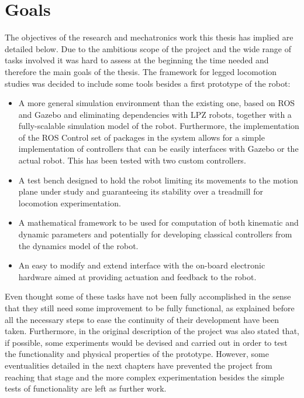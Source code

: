 \section{Goals}
\label{sec:goals}
The objectives of the research and mechatronics work this thesis has implied are detailed below.
Due to the ambitious scope of the project and the wide range of tasks involved it was hard to assess at the beginning the time needed and therefore the main goals of the thesis. 
The framework for legged locomotion studies was decided to include some tools besides a first prototype of the robot:

\begin{itemize}
\item A more general simulation environment than the existing one, based on ROS and Gazebo and eliminating dependencies with LPZ robots, together with a fully-scalable simulation model of the robot. Furthermore, the implementation of the ROS Control set of packages \cite{ros_control} in the system allows for a simple implementation of controllers that can be easily interfaces with Gazebo or the actual robot. This has been tested with two custom controllers.
\item A test bench designed to hold the robot limiting its movements to the motion plane under study and guaranteeing its stability over a treadmill for locomotion experimentation. 
\item A mathematical framework to be used for computation of both kinematic and dynamic parameters and potentially for developing classical controllers from the dynamics model of the robot.
\item An easy to modify and extend interface with the on-board electronic hardware aimed at providing actuation and feedback to the robot.
\end{itemize}

Even thought some of these tasks have not been fully accomplished in the sense that they still need some improvement to be fully functional, as explained before all the necessary steps to ease the continuity of their development have been taken.
Furthermore, in the original description of the project was also stated that, if possible, some experiments would be devised and carried out in order to test the functionality and physical properties of the prototype. 
However, some eventualities detailed in the next chapters have prevented the project from reaching that stage and the more complex experimentation besides the simple tests of functionality are left as further work.